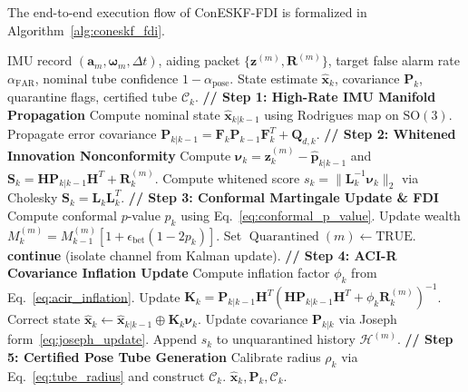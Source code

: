 \documentclass[journal,twocolumn]{IEEEtran}
\newcommand{\SO}{\mathrm{SO}(3)}
\begin{document}
The end-to-end execution flow of ConESKF-FDI is formalized in Algorithm~\ref{alg:coneskf_fdi}.

\begin{algorithm}[t]
\caption{ConESKF-FDI Execution per Flight Tick}
\label{alg:coneskf_fdi}
\begin{algorithmic}[1]
\REQUIRE IMU record $(\mathbf{a}_m, \bm{\omega}_m, \Delta t)$, aiding packet $\{\mathbf{z}^{(m)}, \mathbf{R}^{(m)}\}$, target false alarm rate $\alpha_{\mathrm{FAR}}$, nominal tube confidence $1 - \alpha_{\text{pose}}$.
\ENSURE State estimate $\hat{\mathbf{x}}_k$, covariance $\mathbf{P}_k$, quarantine flags, certified tube $\mathcal{C}_k$.
\STATE \textbf{// Step 1: High-Rate IMU Manifold Propagation}
\STATE Compute nominal state $\hat{\mathbf{x}}_{k|k-1}$ using Rodrigues map on $\SO$.
\STATE Propagate error covariance $\mathbf{P}_{k|k-1} = \mathbf{F}_k \mathbf{P}_{k-1} \mathbf{F}_k^T + \mathbf{Q}_{d,k}$.
    \STATE \textbf{// Step 2: Whitened Innovation Nonconformity}
    \STATE Compute $\bm{\nu}_k = \mathbf{z}_k^{(m)} - \hat{\mathbf{p}}_{k|k-1}$ and $\mathbf{S}_k = \mathbf{H} \mathbf{P}_{k|k-1} \mathbf{H}^T + \mathbf{R}_k^{(m)}$.
    \STATE Compute whitened score $s_k = \|\mathbf{L}_k^{-1} \bm{\nu}_k\|_2$ via Cholesky $\mathbf{S}_k = \mathbf{L}_k \mathbf{L}_k^T$.
    \STATE \textbf{// Step 3: Conformal Martingale Update \& FDI}
        \STATE Compute conformal $p$-value $p_k$ using Eq.~\eqref{eq:conformal_p_value}.
        \STATE Update wealth $M_k^{(m)} = M_{k-1}^{(m)} [1 + \epsilon_{\text{bet}}(1 - 2 p_k)]$.
            \STATE Set $\operatorname{Quarantined}(m) \leftarrow \text{TRUE}$.
            \STATE \textbf{continue} (isolate channel from Kalman update).
        \ENDIF
    \ENDIF
    \STATE \textbf{// Step 4: ACI-R Covariance Inflation Update}
    \STATE Compute inflation factor $\phi_k$ from Eq.~\eqref{eq:acir_inflation}.
        \STATE Update $\mathbf{K}_k = \mathbf{P}_{k|k-1} \mathbf{H}^T (\mathbf{H}\mathbf{P}_{k|k-1}\mathbf{H}^T + \phi_k \mathbf{R}_k^{(m)})^{-1}$.
        \STATE Correct state $\hat{\mathbf{x}}_k \leftarrow \hat{\mathbf{x}}_{k|k-1} \oplus \mathbf{K}_k \bm{\nu}_k$.
        \STATE Update covariance $\mathbf{P}_{k|k}$ via Joseph form~\eqref{eq:joseph_update}.
        \STATE Append $s_k$ to unquarantined history $\mathcal{H}^{(m)}$.
    \ENDIF
\ENDFOR
\STATE \textbf{// Step 5: Certified Pose Tube Generation}
\STATE Calibrate radius $\rho_k$ via Eq.~\eqref{eq:tube_radius} and construct $\mathcal{C}_k$.
\RETURN $\hat{\mathbf{x}}_k, \mathbf{P}_k, \mathcal{C}_k$.
\end{algorithmic}
\end{algorithm}
\end{document}
